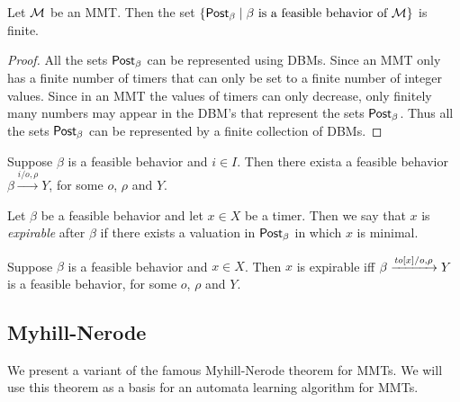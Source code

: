 \begin{lemma}
\label{lemma finitely many zones}
Let ${\cal M}$ be an MMT. Then the set
$\{ \mathsf{Post}_{\beta} \mid \beta \mbox{ is a feasible behavior of } {\cal M} \}$ is finite.
\end{lemma}
\begin{proof}
All the sets $\mathsf{Post}_{\beta}$ can be represented using DBMs. Since an MMT only has a finite number of timers that can only be set to a finite number of integer values. Since in an MMT the values of timers can only decrease, only finitely many numbers may
appear in the DBM's that represent the sets $\mathsf{Post}_{\beta}$. Thus all the sets $\mathsf{Post}_{\beta}$ can be represented by a finite
collection of DBMs.
\end{proof}

\begin{lemma}
Suppose $\beta$ is a feasible behavior and $i \in I$.
Then there exista a feasible behavior $\beta \xrightarrow{i/o, \rho} Y$, for some $o$, $\rho$ and $Y$.
\end{lemma}

Let $\beta$ be a feasible behavior and let $x \in X$ be a timer. Then we say that $x$ is \emph{expirable} after $\beta$
if there exists a valuation in $\mathsf{Post}_{\beta}$ in which $x$ is minimal.

\begin{lemma}
Suppose $\beta$ is a feasible behavior and $x \in X$.
Then $x$ is expirable iff $\beta \xrightarrow{\mathit{to}[x]/o, \rho} Y$ is a feasible behavior, for some $o$, $\rho$ and $Y$.
\end{lemma}

\subsection{Myhill-Nerode}  
We present a variant of the famous Myhill-Nerode theorem for MMTs.
We will use this theorem as a basis for an automata learning algorithm for MMTs.

